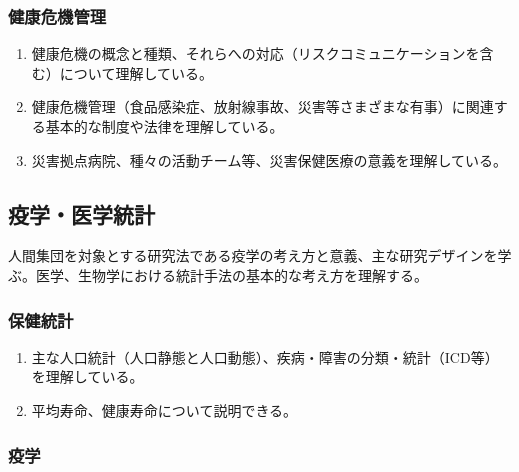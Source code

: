 \hypertarget{ux5065ux5eb7ux5371ux6a5fux7ba1ux7406}{%
\subsubsection{健康危機管理}\label{ux5065ux5eb7ux5371ux6a5fux7ba1ux7406}}

\begin{enumerate}
\def\labelenumi{\arabic{enumi}.}
\tightlist
\item
  健康危機の概念と種類、それらへの対応（リスクコミュニケーションを含む）について理解している。
\item
  健康危機管理（食品感染症、放射線事故、災害等さまざまな有事）に関連する基本的な制度や法律を理解している。
\item
  災害拠点病院、種々の活動チーム等、災害保健医療の意義を理解している。
\end{enumerate}

\hypertarget{ux75abux5b66ux533bux5b66ux7d71ux8a08}{%
\subsection{疫学・医学統計}\label{ux75abux5b66ux533bux5b66ux7d71ux8a08}}

人間集団を対象とする研究法である疫学の考え方と意義、主な研究デザインを学ぶ。医学、生物学における統計手法の基本的な考え方を理解する。

\hypertarget{ux4fddux5065ux7d71ux8a08}{%
\subsubsection{保健統計}\label{ux4fddux5065ux7d71ux8a08}}

\begin{enumerate}
\def\labelenumi{\arabic{enumi}.}
\tightlist
\item
  主な人口統計（人口静態と人口動態）、疾病・障害の分類・統計（ICD等）を理解している。
\item
  平均寿命、健康寿命について説明できる。
\end{enumerate}

\hypertarget{ux75abux5b66}{%
\subsubsection{疫学}\label{ux75abux5b66}}

